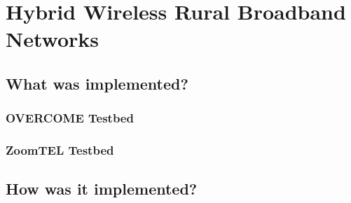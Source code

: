 \chapter{Hybrid Wireless Rural Broadband Networks}
\label{chapter3}


\section{What was implemented?}

\subsection{OVERCOME Testbed}


\subsection{ZoomTEL Testbed}



\section{How was it implemented?}

